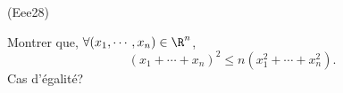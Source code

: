 \begin{tiny}(Eee28)\end{tiny} Montrer que, $\forall (x_1,\cdots,x_n) \in \R^n$,
\[
 (x_1 + \cdots + x_n)^2 \leq n (x_1^2 + \cdots + x_n^2).
\]
Cas d'égalité?